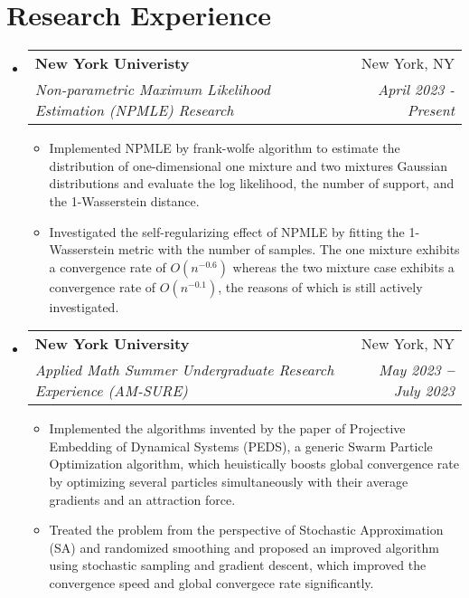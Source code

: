 \documentclass[letterpaper,11pt]{article}
\makeatletter
\newcommand{\resumeItem}[1]{
  \item\small{
    {#1 \vspace{-2pt}}
  }
}
\newcommand{\resumeSubheading}[4]{
  \vspace{-2pt}\item
    \begin{tabular*}{0.97\textwidth}[t]{l@{\extracolsep{\fill}}r}
      \textbf{#1} & #2 \\
      \textit{\small#3} & \textit{\small #4} \\
    \end{tabular*}\vspace{-7pt}
}
\newcommand{\resumeSubHeadingListStart}{\begin{itemize}[leftmargin=0.15in, label={}]}
\newcommand{\resumeSubHeadingListEnd}{\end{itemize}}
\newcommand{\resumeItemListStart}{\begin{itemize}}
\newcommand{\resumeItemListEnd}{\end{itemize}\vspace{-5pt}}
\makeatother
\begin{document}
\section{Research Experience}
  \vspace{3pt}
  \resumeSubHeadingListStart
    \resumeSubheading
        {New York Univeristy}{New York, NY}
        {Non-parametric Maximum Likelihood Estimation (NPMLE) Research}{April 2023 - Present}
        \resumeItemListStart
            \resumeItem{Implemented NPMLE by frank-wolfe algorithm to estimate the distribution of one-dimensional one mixture and two mixtures Gaussian distributions and evaluate the log likelihood, the number of support, and the 1-Wasserstein distance.}
            \resumeItem{Investigated the self-regularizing effect of NPMLE by fitting the 1-Wasserstein metric with the number of samples. The one mixture exhibits a convergence rate of $O(n^{-0.6})$ whereas the two mixture case exhibits a convergence rate of $O(n^{-0.1})$, the reasons of which is still actively investigated.}
        \resumeItemListEnd
    \resumeSubheading
      {New York University}{New York, NY}
      {Applied Math Summer Undergraduate Research Experience (AM-SURE)}{May 2023 \textbf{--} July 2023}
        \resumeItemListStart
            \resumeItem{Implemented the algorithms invented by the paper of Projective Embedding of Dynamical Systems (PEDS), a generic Swarm Particle Optimization algorithm, which heuistically boosts global convergence rate by optimizing several particles simultaneously with their average gradients and an attraction force.}
            \resumeItem{Treated the problem from the perspective of Stochastic Approximation (SA) and randomized smoothing and proposed an improved algorithm using stochastic sampling and gradient descent, which improved the convergence speed and global convergece rate significantly.}
        \resumeItemListEnd
    
  \resumeSubHeadingListEnd

\end{document}
